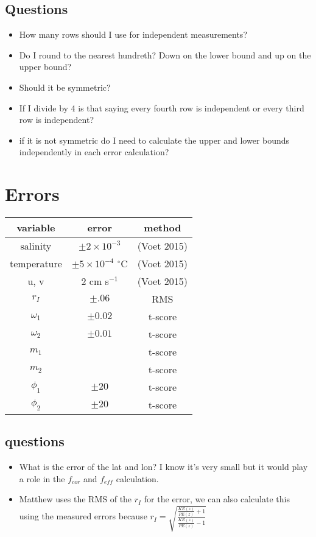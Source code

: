 \documentclass[preprint,12pt]{elsarticle}
\begin{document}
\subsection{Questions}
\begin{itemize}
\item How many rows should I use for independent measurements?
\item Do I round to the nearest hundreth? Down on the lower bound and up on the upper bound?
\item Should it be symmetric?
\item If I divide by 4 is that saying every fourth row is independent or every third row is independent?
\item if it is not symmetric do I need to calculate the upper and lower bounds independently in each error calculation?
\end{itemize}

\section{Errors}
\begin{center}
\begin{tabular}{|c|c|c|}
\hline
\textbf{variable} & \textbf{error} & \textbf{method}\\
\hline
salinity & $\pm2\times10^{-3}$ & (Voet 2015)\\
\hline
temperature & $\pm 5 \times 10^{-4}$ $^\circ$C & (Voet 2015)\\
\hline
u, v & $2$ cm s$^{-1}$ & (Voet 2015)\\
\hline
$r_I$ & $\pm .06$ & RMS \\
\hline
$\omega_1$ & $\pm 0.02$ & t-score\\
\hline
$\omega_2$ & $\pm 0.01$ & t-score\\
\hline
$m_1$ & & t-score\\
\hline
$m_2$ & & t-score\\
\hline
$\phi_1$ & $\pm 20$& t-score\\
\hline
$\phi_2$ & $\pm 20$ & t-score\\
\hline
\end{tabular}
\end{center}

\subsection{questions}
\begin{itemize}
\item What is the error of the lat and lon?  I know it's very small but it would play a role in the $f_{cor}$ and $f_{eff}$ calculation.
\item Matthew uses the RMS of the $r_I$ for the error, we can also calculate this using the measured errors because $r_I = \sqrt{\frac{\frac{KE(z)}{PE(z)}+1}{\frac{KE(z)}{PE(z)}-1}}$
\end{itemize}
\end{document}
